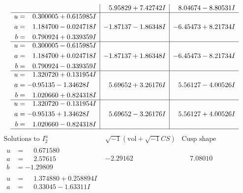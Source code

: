 \documentclass[1p]{elsarticle_modified}
\theoremstyle{definition}
\newcommand{\I}{\sqrt{-1}}
\begin{document}
$$\begin{array}{c|c|c}
 & \phantom{-}5.95829 + 7.42742 I & \phantom{-}8.04674 - 8.80531 I \\ \hline\begin{aligned}
u &= \phantom{-}0.300005 + 0.615985 I \\
a &= \phantom{-}1.184700 - 0.024718 I \\
b &= \phantom{-}0.790924 + 0.339359 I\end{aligned}
 & -1.87137 - 1.86348 I & -6.45473 + 8.21734 I \\ \hline\begin{aligned}
u &= \phantom{-}0.300005 - 0.615985 I \\
a &= \phantom{-}1.184700 + 0.024718 I \\
b &= \phantom{-}0.790924 - 0.339359 I\end{aligned}
 & -1.87137 + 1.86348 I & -6.45473 - 8.21734 I \\ \hline\begin{aligned}
u &= \phantom{-}1.320720 + 0.131954 I \\
a &= -0.95135 - 1.34628 I \\
b &= \phantom{-}1.020660 + 0.824318 I\end{aligned}
 & \phantom{-}5.69652 + 3.26176 I & \phantom{-}5.56127 - 4.00526 I \\ \hline\begin{aligned}
u &= \phantom{-}1.320720 - 0.131954 I \\
a &= -0.95135 + 1.34628 I \\
b &= \phantom{-}1.020660 - 0.824318 I\end{aligned}
 & \phantom{-}5.69652 - 3.26176 I & \phantom{-}5.56127 + 4.00526 I\\
 \hline 
 \end{array}$$\newpage$$\begin{array}{c|c|c}  
\text{Solutions to }I^u_{2}& \I (\text{vol} + \sqrt{-1}CS) & \text{Cusp shape}\\
 \hline 
\begin{aligned}
u &= \phantom{-}0.671580\phantom{ +0.000000I} \\
a &= \phantom{-}2.57615\phantom{ +0.000000I} \\
b &= -1.29809\phantom{ +0.000000I}\end{aligned}
 & -2.29162\phantom{ +0.000000I} & \phantom{-}7.08010\phantom{ +0.000000I} \\ \hline\begin{aligned}
u &= \phantom{-}1.374880 + 0.258894 I \\
a &= \phantom{-}0.33045 - 1.63311 I \\

\end{aligned}
\end{array}$$
\end{document}
